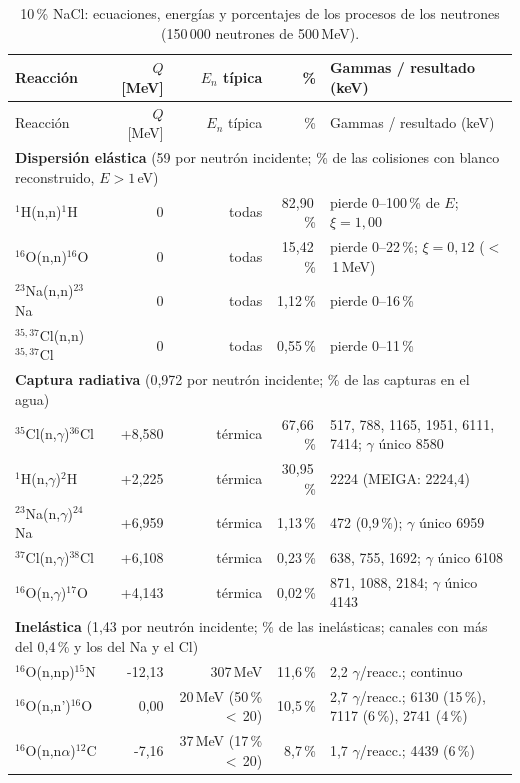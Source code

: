 \documentclass[11pt,a4paper]{article}
\begin{document}
{\footnotesize\begin{longtable}{p{4.4cm}rrrp{4.6cm}}
\caption{10\,\% NaCl: ecuaciones, energías y porcentajes de los procesos de los neutrones (150\,000 neutrones de 500\,MeV).}\label{tab:procesos_nacl10}\\\toprule
Reacción & $Q$ [MeV] & $E_n$ típica & \% & Gammas / resultado (keV) \\\midrule\endfirsthead
\toprule Reacción & $Q$ [MeV] & $E_n$ típica & \% & Gammas / resultado (keV) \\\midrule\endhead
\multicolumn{5}{l}{\textbf{Dispersión elástica} (59 por neutrón incidente; \% de las colisiones con blanco reconstruido, $E>1$\,eV)}\\
$^1$H(n,n)$^1$H & 0 & todas & 82,90\,\% & pierde 0--100\,\% de $E$; $\xi = 1{,}00$ \\
$^{16}$O(n,n)$^{16}$O & 0 & todas & 15,42\,\% & pierde 0--22\,\%; $\xi = 0{,}12$ ($<$\,1\,MeV) \\
$^{23}$Na(n,n)$^{23}$Na & 0 & todas & 1,12\,\% & pierde 0--16\,\% \\
$^{35,37}$Cl(n,n)$^{35,37}$Cl & 0 & todas & 0,55\,\% & pierde 0--11\,\% \\
\midrule\multicolumn{5}{l}{\textbf{Captura radiativa} (0,972 por neutrón incidente; \% de las capturas en el agua)}\\
$^{35}$Cl(n,$\gamma$)$^{36}$Cl & +8,580 & térmica & 67,66\,\% & 517, 788, 1165, 1951, 6111, 7414; $\gamma$ único 8580 \\
$^1$H(n,$\gamma$)$^2$H & +2,225 & térmica & 30,95\,\% & 2224 (MEIGA: 2224,4) \\
$^{23}$Na(n,$\gamma$)$^{24}$Na & +6,959 & térmica & 1,13\,\% & 472 (0,9\,\%); $\gamma$ único 6959 \\
$^{37}$Cl(n,$\gamma$)$^{38}$Cl & +6,108 & térmica & 0,23\,\% & 638, 755, 1692; $\gamma$ único 6108 \\
$^{16}$O(n,$\gamma$)$^{17}$O & +4,143 & térmica & 0,02\,\% & 871, 1088, 2184; $\gamma$ único 4143 \\
\midrule\multicolumn{5}{l}{\textbf{Inelástica} (1,43 por neutrón incidente; \% de las inelásticas; canales con más del 0,4\,\% y los del Na y el Cl)}\\
$^{16}$O(n,np)$^{15}$N & -12,13 & 307\,MeV & 11,6\,\% & 2,2 $\gamma$/reacc.; continuo \\
$^{16}$O(n,n')$^{16}$O & 0,00 & 20\,MeV (50\,\% $<$\,20) & 10,5\,\% & 2,7 $\gamma$/reacc.; 6130 (15\,\%), 7117 (6\,\%), 2741 (4\,\%) \\
$^{16}$O(n,n$\alpha$)$^{12}$C & -7,16 & 37\,MeV (17\,\% $<$\,20) & 8,7\,\% & 1,7 $\gamma$/reacc.; 4439 (6\,\%) \\

\end{longtable}}
\end{document}
